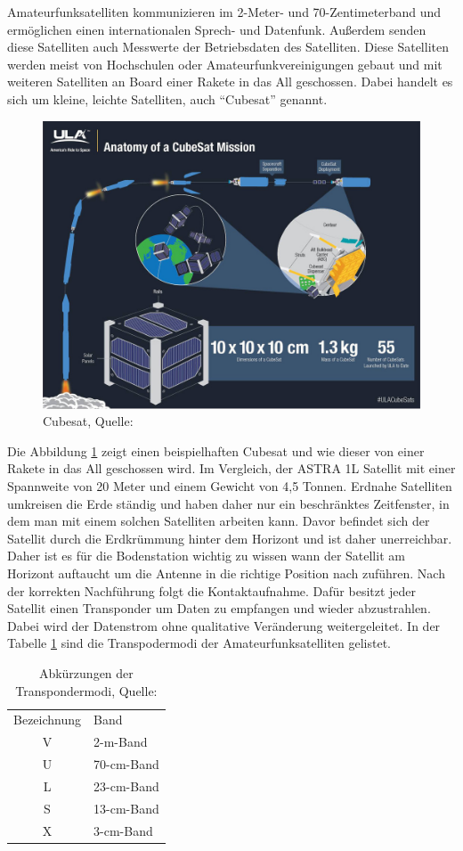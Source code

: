 Amateurfunksatelliten kommunizieren im 2-Meter- und 70-Zentimeterband \cite{Wiki:amateur} und ermöglichen einen 
internationalen Sprech- und Datenfunk. Außerdem senden diese Satelliten
auch Messwerte der Betriebsdaten des Satelliten. Diese Satelliten werden meist von Hochschulen oder Amateurfunkvereinigungen gebaut und mit weiteren 
Satelliten an Board einer Rakete in das All geschossen. Dabei handelt es sich um kleine, leichte Satelliten, auch ``Cubesat'' genannt.

\begin{figure}[h]
 \centering
 \includegraphics[width=0.7\linewidth]{./images/cubesat}
 \caption[Cubesat]{Cubesat, Quelle: \cite{cubesat}}
 \label{fig:cubesat}
\end{figure}
Die Abbildung \ref{fig:cubesat} zeigt einen beispielhaften Cubesat und wie dieser von einer Rakete in 
das All geschossen wird. Im Vergleich, der ASTRA 1L Satellit mit 
einer Spannweite von 20 Meter und einem Gewicht von 4,5 Tonnen. Erdnahe Satelliten umkreisen die 
Erde ständig und haben daher nur ein beschränktes 
Zeitfenster, in dem man mit einem solchen Satelliten arbeiten kann. Davor befindet sich der Satellit durch die Erdkrümmung hinter dem Horizont und 
ist daher unerreichbar. Daher ist es für die Bodenstation wichtig zu wissen wann der Satellit am Horizont auftaucht um die Antenne in die richtige 
Position nach zuführen. Nach der korrekten Nachführung folgt die Kontaktaufnahme. Dafür besitzt jeder Satellit einen Transponder um Daten zu 
empfangen und wieder abzustrahlen. Dabei wird der Datenstrom ohne qualitative Veränderung weitergeleitet. In der Tabelle \ref{tab:modi} sind die 
Transpodermodi der Amateurfunksatelliten gelistet. 
\begin{table}[h]
	\centering
	\caption{Abkürzungen der Transpondermodi, Quelle: \cite{amateursat}}
	\begin{tabular}{c|l}
		Bezeichnung & Band\\ 
		V & 2-m-Band 	\\
		U & 70-cm-Band 	\\
		L & 23-cm-Band 	\\
		S & 13-cm-Band 	\\
		X & 3-cm-Band 	\\
	\end{tabular} 
	\label{tab:modi}
\end{table}
